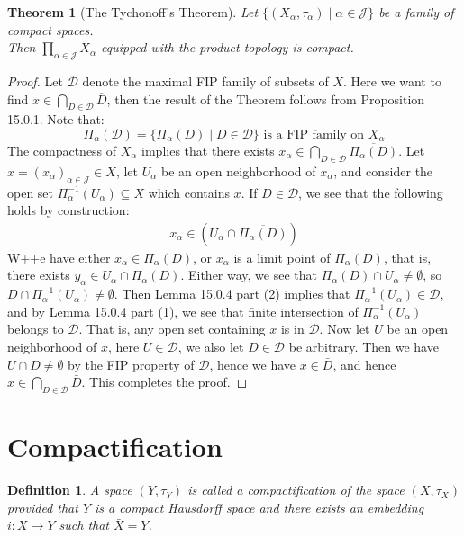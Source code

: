 \documentclass[11pt]{book}
\theoremstyle{break}
\theoremstyle{break}
\newtheorem{thm}{Theorem}[section]
\newtheorem{defn}{Definition}[corL]
\begin{document}
\begin{thm}[The Tychonoff's Theorem]
Let $\{(X_\alpha,\tau_\alpha) \mid \alpha \in \mathcal{J}\}$ be a family of compact spaces. \\Then $\prod_{\alpha \in \mathcal{J}}X_\alpha$ equipped with the product topology is compact.
\end{thm}
\begin{proof}
Let $\mathcal{D}$ denote the maximal FIP family of subsets of $X$. Here we want to find $x \in \bigcap_{D\in \mathcal{D}}\overline{D}$, then the result of the Theorem follows from Proposition 15.0.1. Note that: 
$$\Pi_\alpha(\mathcal{D}) = \{ \Pi_\alpha (D) \mid D\in \mathcal{D}\} \text{ is a FIP family on }X_\alpha$$ 
The compactness of $X_\alpha$ implies that there exists $x_\alpha \in \bigcap_{D\in \mathcal{D}}\overline{ \Pi_\alpha(D)}$. Let $x = (x_\alpha)_{\alpha \in \mathcal{J}} \in X$, let $U_\alpha$ be an open neighborhood of $x_\alpha$, and consider the open set $\Pi_\alpha^{-1}(U_\alpha) \subseteq X$ which contains $x$. If $D \in \mathcal{D}$, we see that the following holds by construction:
\begin{align*}
x_\alpha \in \left( U_\alpha \cap \overline{\Pi_\alpha (D)}\right)
\end{align*}
W++e have either $x_\alpha \in \Pi_\alpha(D)$, or $x_\alpha$ is a limit point of $\Pi_\alpha(D)$, that is, there exists $y_\alpha \in U_\alpha \cap \Pi_\alpha(D)$. Either way, we see that $\Pi_\alpha(D) \cap U_\alpha \neq \emptyset$, so $D \cap \Pi_\alpha^{-1}(U_\alpha) \neq \emptyset$. Then Lemma 15.0.4 part (2) implies that $\Pi_\alpha^{-1}(U_\alpha) \in \mathcal{D}$, and by Lemma 15.0.4 part (1), we see that finite intersection of $\Pi_\alpha^{-1}(U_\alpha)$ belongs to $\mathcal{D}$. That is, any open set containing $x$ is in $\mathcal{D}$. Now let $U$ be an open neighborhood of $x$, here $U \in \mathcal{D}$, we also let $D \in \mathcal{D}$ be arbitrary. Then we have $U\cap D \neq \emptyset$ by the FIP property of $\mathcal{D}$, hence we have $x \in \bar{D}$, and hence $x \in \bigcap_{D\in \mathcal{D}}\bar{D}$. This completes the proof. 
\end{proof}

\newpage
\section[Compactification]{\color{red} Compactification\color{black}}
\begin{defn}
A space $(Y,\tau_Y)$ is called a compactification of the space $(X,\tau_X)$ provided that $Y$ is a compact Hausdorff space and there exists an embedding $i:X \to Y$ such that $\bar{X} = Y$. 
\end{defn}
\end{document}
